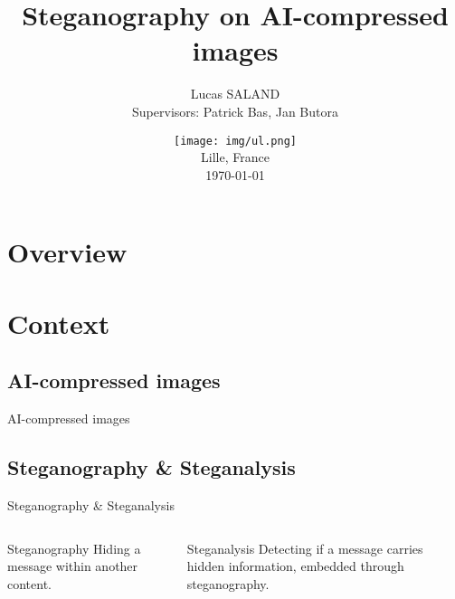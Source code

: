 \documentclass[11pt,compress]{beamer} %
\begin{document}
\title[]{Steganography on AI-compressed images}
\author{Lucas SALAND\\ Supervisors: Patrick Bas, Jan Butora}
\date[\today]{\texttt{[image: img/ul.png]} \medskip \\ Lille, France \medskip \\ \today}

\frame{\titlepage}

\section*{Overview}
\begin{frame}
  \tableofcontents
\end{frame}

\section{Context}
\subsection{AI-compressed images}
\begin{frame}{AI-compressed images}
\end{frame}

\subsection{Steganography \& Steganalysis}

\begin{frame}{Steganography \& Steganalysis}
  \begin{columns}
    \begin{column}{0.4\textwidth}
      \begin{block}{Steganography}
        Hiding a message within another content.
      \end{block}
    \end{column}
    \begin{column}{0.45\textwidth}
      \begin{block}{Steganalysis}
        Detecting if a message carries hidden information, embedded through steganography.
      \end{block}
    \end{column}
  \end{columns}
\end{frame}
\end{document}
